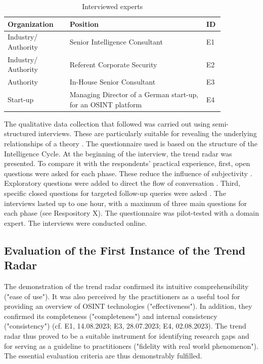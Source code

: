 \documentclass[10pt]{article}
\begin{document}
\begin{table}[htbp]
    \caption{Interviewed experts}
    \begin{tabular}{|p{0.25\linewidth}|p{0.55\linewidth}|p{0.05\linewidth}|}
        \hline
        \textbf{Organization} & \textbf{Position}                                             & \textbf{ID} \\
        \hline
        Industry/ Authority   & Senior Intelligence Consultant                                & E1          \\
        \hline
        Industry/ Authority   & Referent Corporate Security                                   & E2          \\
        \hline
        Authority             & In-House Senior Consultant                                    & E3          \\
        \hline
        Start-up              & Managing Director of a German start-up, for an OSINT platform & E4          \\
        \hline
    \end{tabular}
    \label{tab:experts}
\end{table}

The qualitative data collection that followed was carried out using
semi-structured interviews. These are particularly suitable for
revealing the underlying relationships of a theory \cite{Bogner.2014}. The
questionnaire used is based on the structure of the Intelligence Cycle.
At the beginning of the interview, the trend radar was presented.
To compare it with the respondents' practical experience, first, open questions
were asked for each phase. These reduce the influence of
subjectivity \cite{Saunders.2012}. Exploratory questions were added to direct the flow of conversation
\cite{Saunders.2012}. Third, specific closed questions for targeted follow-up
queries were asked \cite{Saunders.2012}. The interviews lasted up to one hour, with a maximum of three
main questions for each phase \cite{Bogner.2014} (see Respository X). The questionnaire
was pilot-tested with a domain expert. The interviews were conducted online.

\subsection{Evaluation of the First Instance of the Trend Radar}

The demonstration of the trend radar confirmed its intuitive
comprehensibility ("ease of use"). It was also perceived by the
practitioners as a useful tool for providing an overview of OSINT
technologies ("effectiveness"). In addition, they confirmed its
completeness ("completeness") and internal consistency ("consistency")
(cf. E1, 14.08.2023; E3, 28.07.2023; E4,
02.08.2023). The trend radar thus proved to be a
suitable instrument for identifying research gaps and for serving as a guideline to practitioners
("fidelity with real world phenomenon"). The essential evaluation
criteria \cite{Sonnenberg.2012} are thus demonstrably fulfilled.
\end{document}
